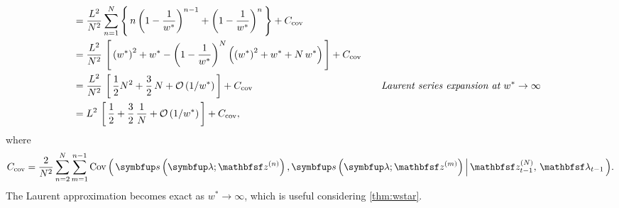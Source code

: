 \begin{proofEnd}
\begin{alignat}{2}
    \nonumber
    \\
    &\;=
    \frac{L^2}{N^2}\sum^{N}_{n=1}
    \left\{\,
      n \, {\left(1 - \frac{1}{w^*}\right)}^{n-1}
      +
      {\left(1 - \frac{1}{w^*}\right)}^{n} 
      \,\right\}
      +
    C_{\text{cov}}
    \nonumber
    \\
    &\;=
    \frac{L^2}{N^2} \,
    \left[\,
      {\left(w^*\right)}^2 + w^*
      -
      {\left(1 - \frac{1}{w^*}\right)}^N
      \left(
        {\left(w^*\right)}^2 + w^* + N\,w^*
      \right)
    \,\right]
    +
    C_{\text{cov}}
    \nonumber
    \\
    &\;=
    \frac{L^2}{N^2} \,
    \left[\,
    \frac{1}{2} N^2 + \frac{3}{2}\,N 
    + \mathcal{O}\left(1/w^*\right)
    \,\right]
    +
    C_{\text{cov}}
    \nonumber
    &&\quad\text{\textit{Laurent series expansion at \(w^* \rightarrow \infty\)}}
    \\
    &\;=
    L^2 \,
    \left[\,
    \frac{1}{2} + \frac{3}{2}\,\frac{1}{N}
    + \mathcal{O}\left(1/w^*\right)
    \,\right] + C_{\text{cov}},
    \nonumber
  \end{alignat}
  where \[
  C_\text{cov} = {\frac{2}{N^2} \sum^{N}_{n=2} \sum^{n-1}_{m = 1} \Cov{\vs\left(\vlambda; \rvvz^{(n)}\right), \vs\left(\vlambda; \rvvz^{(m)}\right) \,\middle|\, \rvvz_{t-1}^{(N)},\, \rvvlambda_{t-1} }}.\]
  The Laurent approximation becomes exact as \(w^* \rightarrow \infty\), which is useful considering \cref{thm:wstar}.
\end{proofEnd}

